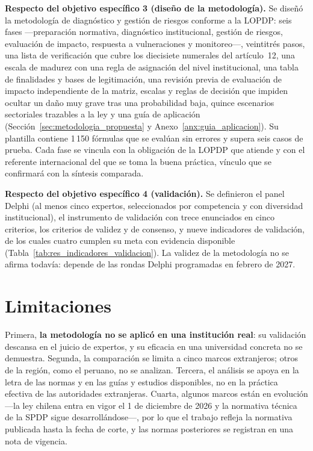 \textbf{Respecto del objetivo específico 3 (diseño de la metodología).} Se diseñó la metodología de diagnóstico y gestión de riesgos conforme a la LOPDP: seis fases ---preparación normativa, diagnóstico institucional, gestión de riesgos, evaluación de impacto, respuesta a vulneraciones y monitoreo---, veintitrés pasos, una lista de verificación que cubre los diecisiete numerales del artículo~12, una escala de madurez con una regla de asignación del nivel institucional, una tabla de finalidades y bases de legitimación, una revisión previa de evaluación de impacto independiente de la matriz, escalas y reglas de decisión que impiden ocultar un daño muy grave tras una probabilidad baja, quince escenarios sectoriales trazables a la ley y una guía de aplicación (Sección~\ref{sec:metodologia_propuesta} y Anexo~\ref{anx:guia_aplicacion}). Su plantilla contiene 1\,150 fórmulas que se evalúan sin errores y supera seis casos de prueba. Cada fase se vincula con la obligación de la LOPDP que atiende y con el referente internacional del que se toma la buena práctica, vínculo que se confirmará con la síntesis comparada.

\textbf{Respecto del objetivo específico 4 (validación).} Se definieron el panel Delphi (al menos cinco expertos, seleccionados por competencia y con diversidad institucional), el instrumento de validación con trece enunciados en cinco criterios, los criterios de validez y de consenso, y nueve indicadores de validación, de los cuales cuatro cumplen su meta con evidencia disponible (Tabla~\ref{tab:res_indicadores_validacion}). La validez de la metodología no se afirma todavía: depende de las rondas Delphi programadas en febrero de 2027.

\section{Limitaciones}

Primera, \textbf{la metodología no se aplicó en una institución real}: su validación descansa en el juicio de expertos, y su eficacia en una universidad concreta no se demuestra. Segunda, la comparación se limita a cinco marcos extranjeros; otros de la región, como el peruano, no se analizan. Tercera, el análisis se apoya en la letra de las normas y en las guías y estudios disponibles, no en la práctica efectiva de las autoridades extranjeras. Cuarta, algunos marcos están en evolución ---la ley chilena entra en vigor el 1 de diciembre de 2026 y la normativa técnica de la SPDP sigue desarrollándose---, por lo que el trabajo refleja la normativa publicada hasta la fecha de corte, y las normas posteriores se registran en una nota de vigencia.

